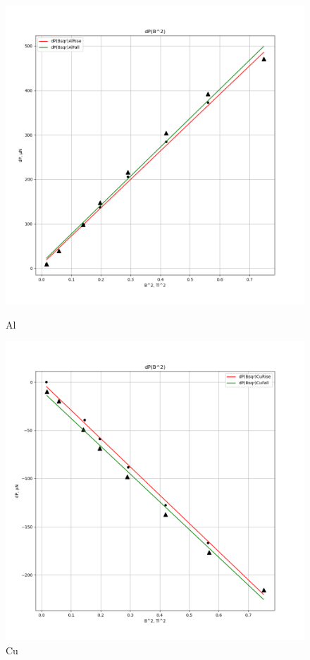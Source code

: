 \documentclass[a4paper, 12pt]{article}
\begin{document}
\begin{figure}[H]
    \centering
    \begin{minipage}{0.5\textwidth}
        \centering
        \includegraphics[width=\textwidth]{img/dP(Bsqr)Al.png}
        \caption{Al}
        \label{fig:image3}
    \end{minipage}\hfill
    \begin{minipage}{0.5\textwidth}
        \centering
        \includegraphics[width=\textwidth]{img/dP(Bsqr)Cu.png}
        \caption{Cu}
        \label{fig:image4}
    \end{minipage}
\end{figure}
\end{document}
